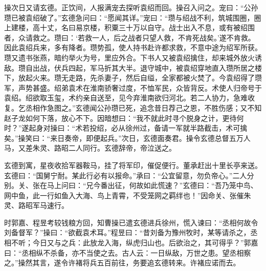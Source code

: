 操次日又请玄德。正饮间，人报满宠去探听袁绍而回。操召入问之。宠曰：“公孙瓒已被袁绍破了。”玄德急问曰：“愿闻其详。”宠曰：“瓒与绍战不利，筑城围圈，圈上建楼，高十丈，名曰易京楼，积粟三十万以自守。战士出入不息，或有被绍围者，众请救之。瓒曰：‘若救一人，后之战者只望人救，不肯死战矣。’遂不肯救。因此袁绍兵来，多有降者。瓒势孤，使人持书赴许都求救，不意中途为绍军所获。瓒又遗书张燕，暗约举火为号，里应外合。下书人又被袁绍擒住，却来城外放火诱敌。瓒自出战，伏兵四起，军马折其大半。退守城中，被袁绍穿地直入瓒所居之楼下，放起火来。瓒无走路，先杀妻子，然后自缢，全家都被火焚了。今袁绍得了瓒军，声势甚盛。绍弟袁术在淮南骄奢过度，不恤军民，众皆背反。术使人归帝号于袁绍。绍欲取玉玺，术约亲自送至，见今弃淮南欲归河北。若二人协力，急难收复。乞丞相作急图之。”玄德闻公孙瓒已死，追念昔日荐己之恩，不胜伤感；又不知赵子龙如何下落，放心不下。因暗想曰：“我不就此时寻个脱身之计，更待何时？”遂起身对操曰：“术若投绍，必从徐州过，备请一军就半路截击，术可擒矣。”操笑曰：“来日奏帝，即便起兵。”次日，玄德面奏君。操令玄德总督五万人马，又差朱灵、路昭二人同行。玄德辞帝，帝泣送之。

玄德到寓，星夜收拾军器鞍马，挂了将军印，催促便行。董承赶出十里长亭来送。玄德曰：“国舅宁耐。某此行必有以报命。”承曰：“公宜留意，勿负帝心。”二人分别。关、张在马上问曰：“兄今番出征，何故如此慌速？”玄德曰：“吾乃笼中鸟、网中鱼，此一行如鱼入大海、鸟上青霄，不受笼网之羁绊也！”因命关、张催朱灵、路昭军马速行。

时郭嘉、程昱考较钱粮方回，知曹操已遣玄德进兵徐州，慌入谏曰：“丞相何故令刘备督军？”操曰：“欲截袁术耳。”程昱曰：“昔刘备为豫州牧时，某等请杀之，丞相不听；今日又与之兵：此放龙入海，纵虎归山也。后欲治之，其可得乎？”郭嘉曰：“丞相纵不杀备，亦不当使之去。古人云：一日纵敌，万世之患。望丞相察之。”操然其言，遂令许褚将兵五百前往，务要追玄德转来。许褚应诺而去。

